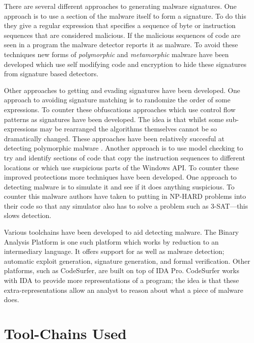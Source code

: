 \documentclass[12pt,]{book}
\begin{document}
There are several different approaches to generating malware signatures.
One approach is to use a section of the malware itself to form a
signature. To do this they give a regular expression that specifies a
sequence of byte or instruction sequences that are considered malicious.
If the malicious sequences of code are seen in a program the malware
detector reports it as malware. To avoid these techniques new forms of
\emph{polymorphic} and \emph{metamorphic} malware have been developed
which use self modifying code and encryption to hide these signatures
from signature based detectors\autocite{Christodorescu:2005vf}.

Other approaches to getting and evading signatures have been developed.
One approach to avoiding signature matching is to randomize the order of
some
expressions\autocite{Borello:2008vx}\autocite{Christodorescu:2005vf}. To
counter these obfuscations approaches which use control flow patterns as
signatures have been developed\autocite{Bonfante:2007th}. The idea is
that whilst some sub-expressions may be rearranged the algorithms
themselves cannot be so dramatically changed. These approaches have been
relatively succesful at detecting polymorphic malware
\autocite{Kang:2011bs}\autocite{Bruschi:vb}. Another approach is to use
model checking to try and identify sections of code that copy the
instruction sequences to different locations or which use suspicious
parts of the Windows API\autocite{Kinder:2005hu}. To counter these
improved protections more techniques have been developed. One approach
to detecting malware is to simulate it and see if it does anything
suspicious. To counter this malware authors have taken to putting in
NP-HARD problems into their code so that any simulator also has to solve
a problem such as 3-SAT\autocite{Moser:2007cd}---this slows detection.

Various toolchains have been developed to aid detecting malware. The
Binary Analysis Platform\autocite{Brumley:wn} is one such platform which
works by reduction to an intermediary language. It offers support for as
well as malware detection; automatic exploit
generation\autocite{Avgerinos:vo}, signature generation, and formal
verification. Other platforms, such as
CodeSurfer\autocite{Balakrishnan:2005tx}, are built on top of IDA
Pro\autocite{HexRays:up}. CodeSurfer works with IDA to provide more
representations of a program; the idea is that these
extra-representations allow an analyst to reason about what a piece of
malware does.

\section{Tool-Chains Used}
\end{document}
